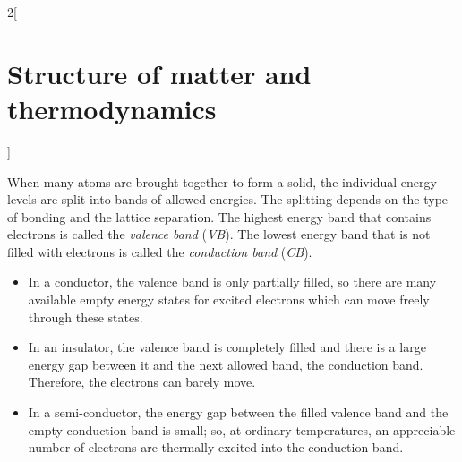 \documentclass[../../../main.tex]{subfiles}
\begin{document}
\begin{multicols}{2}[\section{Structure of matter and thermodynamics}]
\begin{definition}
\begin{center}
      \begin{minipage}{\linewidth}
        \centering
        
      \end{minipage}
    \end{center}
  \end{definition}
  \begin{proposition}
    When many atoms are brought together to form a solid, the individual energy levels are split into bands of allowed energies. The splitting depends on the type of bonding and the lattice separation. The highest energy band that contains electrons is called the \emph{valence band} (\emph{VB}). The lowest energy band that is not filled with electrons is called the \emph{conduction band} (\emph{CB}).
    \begin{center}
      \begin{minipage}{\linewidth}
        \centering
        
      \end{minipage}
    \end{center}
    \begin{itemize}
      \item In a conductor, the valence band is only partially filled, so there are many available empty energy states for excited electrons which can move freely through these states.
      \item In an insulator, the valence band is completely filled and there is a large energy gap between it and the next allowed band, the conduction band. Therefore, the electrons can barely move.
      \item In a semi-conductor, the energy gap between the filled valence band and the empty conduction band is small; so, at ordinary temperatures, an appreciable number of electrons are thermally excited into the conduction band.
    \end{itemize}
  \end{proposition}
\end{multicols}
\begin{center}
  \begin{minipage}{\linewidth}
    \centering
    
  \end{minipage}
\end{center}
\end{document}
